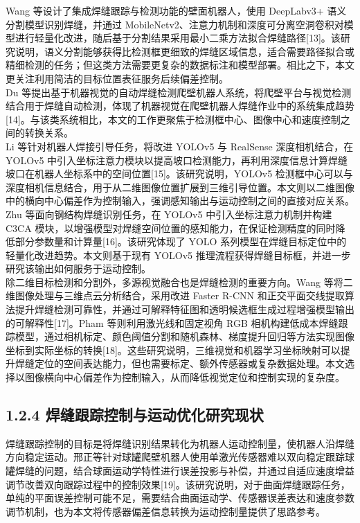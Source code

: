 \documentclass[UTF8,a4paper,12pt]{ctexrep}
\begin{document}
Wang 等设计了集成焊缝跟踪与检测功能的壁面机器人，使用 DeepLabv3+ 语义分割模型识别焊缝，并通过 MobileNetv2、注意力机制和深度可分离空洞卷积对模型进行轻量化改进，随后基于分割结果采用最小二乘方法拟合焊缝路径[13]。该研究说明，语义分割能够获得比检测框更细致的焊缝区域信息，适合需要路径拟合或精细检测的任务；但这类方法需要更复杂的数据标注和模型部署。相比之下，本文更关注利用简洁的目标位置表征服务后续偏差控制。\\

Du 等提出基于机器视觉的自动焊缝检测爬壁机器人系统，将爬壁平台与视觉检测结合用于焊缝自动检测，体现了机器视觉在爬壁机器人焊缝作业中的系统集成趋势[14]。与该类系统相比，本文的工作更聚焦于检测框中心、图像中心和速度控制之间的转换关系。\\

Li 等针对机器人焊接引导任务，将改进 YOLOv5 与 RealSense 深度相机结合，在 YOLOv5 中引入坐标注意力模块以提高坡口检测能力，再利用深度信息计算焊缝坡口在机器人坐标系中的空间位置[15]。该研究说明，YOLOv5 检测框中心可以与深度相机信息结合，用于从二维图像位置扩展到三维引导位置。本文则以二维图像中的横向中心偏差作为控制输入，强调感知输出与运动控制之间的直接对应关系。\\

Zhu 等面向钢结构焊缝识别任务，在 YOLOv5 中引入坐标注意力机制并构建 C3CA 模块，以增强模型对焊缝空间位置的感知能力，在保证检测精度的同时降低部分参数量和计算量[16]。该研究体现了 YOLO 系列模型在焊缝目标定位中的轻量化改进趋势。本文则基于现有 YOLOv5 推理流程获得焊缝目标框，并进一步研究该输出如何服务于运动控制。\\

除二维目标检测和分割外，多源视觉融合也是焊缝检测的重要方向。Wang 等将二维图像处理与三维点云分析结合，采用改进 Faster R-CNN 和正交平面交线提取算法提升焊缝检测可靠性，并通过可解释特征图和透明候选框生成过程增强模型输出的可解释性[17]。Pham 等则利用激光线和固定视角 RGB 相机构建低成本焊缝跟踪模型，通过相机标定、颜色阈值分割和随机森林、梯度提升回归等方法实现图像坐标到实际坐标的转换[18]。这些研究说明，三维视觉和机器学习坐标映射可以提升焊缝定位的空间表达能力，但也需要标定、额外传感器或复杂数据处理。本文选择以图像横向中心偏差作为控制输入，从而降低视觉定位和控制实现的复杂度。\\

\subsection{1.2.4 焊缝跟踪控制与运动优化研究现状}

焊缝跟踪控制的目标是将焊缝识别结果转化为机器人运动控制量，使机器人沿焊缝方向稳定运动。邢正等针对球罐爬壁机器人使用单激光传感器难以双向稳定跟踪球罐焊缝的问题，结合球面运动学特性进行误差投影与补偿，并通过自适应速度增益调节改善双向跟踪过程中的控制效果[19]。该研究说明，对于曲面焊缝跟踪任务，单纯的平面误差控制可能不足，需要结合曲面运动学、传感器误差表达和速度参数调节机制，也为本文将传感器偏差信息转换为运动控制量提供了思路参考。\\
\end{document}
